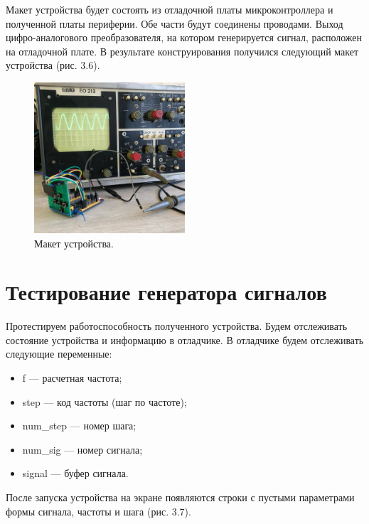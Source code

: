 	Макет устройства будет состоять из отладочной платы микроконтроллера и полученной платы периферии. Обе части будут соединены проводами. Выход цифро-аналогового преобразователя, на котором генерируется сигнал, расположен на отладочной плате. В результате конструирования получился следующий макет устройства (рис. 3.6).

	\begin{figure}[H]
    \centering
    \includegraphics[width=0.5\textwidth]{../image/m2.jpg}
    \caption{Макет устройства.}
	\end{figure}	

\section{Тестирование генератора сигналов}
	
	Протестируем работоспособность полученного устройства. Будем отслеживать состояние устройства и информацию в отладчике. В отладчике будем отслеживать следующие переменные:
	\begin{itemize}
	\item f --- расчетная частота;
	\item step --- код частоты (шаг по частоте);
	\item num\_step --- номер шага;
	\item num\_sig --- номер сигнала;
	\item signal --- буфер сигнала.
	\end{itemize}		
	
	После запуска устройства на экране появляются строки с пустыми параметрами формы сигнала, частоты и шага (рис. 3.7). 

